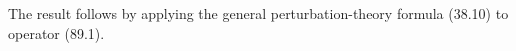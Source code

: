 \SolutionHeading The result follows by applying the general perturbation-theory formula (38.10) to operator (89.1).
